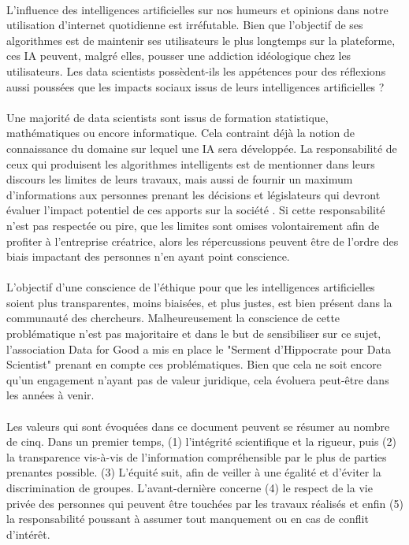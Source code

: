 \documentclass[10pt, french, a4paper]{report}
\begin{document}
\paragraph{}
L’influence des intelligences artificielles sur nos humeurs et opinions dans notre utilisation d’internet quotidienne est irréfutable. Bien que l’objectif de ses algorithmes est de maintenir ses utilisateurs le plus longtemps sur la plateforme, ces IA peuvent, malgré elles, pousser une addiction idéologique chez les utilisateurs. Les data scientists possèdent-ils les appétences pour des réflexions aussi poussées que les impacts sociaux issus de leurs intelligences artificielles ?

\paragraph{}
Une majorité de data scientists sont issus de formation statistique, mathématiques ou encore informatique. Cela contraint déjà la notion de connaissance du domaine sur lequel une IA sera développée. La responsabilité de ceux qui produisent les algorithmes intelligents est de mentionner dans leurs discours les limites de leurs travaux, mais aussi de fournir un maximum d’informations aux personnes prenant les décisions et législateurs qui devront évaluer l’impact potentiel de ces apports sur la société \citep{cointe_ethical_2017}. Si cette responsabilité n’est pas respectée ou pire, que les limites sont omises volontairement afin de profiter à l’entreprise créatrice, alors les répercussions peuvent être de l’ordre des biais impactant des personnes n’en ayant point conscience.

\paragraph{}
L’objectif d’une conscience de l’éthique pour que les intelligences artificielles soient plus transparentes, moins biaisées, et plus justes, est bien présent dans la communauté des chercheurs. Malheureusement la conscience de cette problématique n’est pas majoritaire et dans le but de sensibiliser sur ce sujet, l’association Data for Good a mis en place le "Serment d’Hippocrate pour Data Scientist" \citep{data_for_good_serment_2018} prenant en compte ces problématiques. Bien que cela ne soit encore qu’un engagement n’ayant pas de valeur juridique, cela évoluera peut-être dans les années à venir.

\paragraph{}
Les valeurs qui sont évoquées dans ce document peuvent se résumer au nombre de cinq. Dans un premier temps, (1) l’intégrité scientifique et la rigueur, puis (2) la transparence vis-à-vis de l’information compréhensible par le plus de parties prenantes possible. (3) L’équité suit, afin de veiller à une égalité et d’éviter la discrimination de groupes. L’avant-dernière concerne (4) le respect de la vie privée des personnes qui peuvent être touchées par les travaux réalisés et enfin (5) la responsabilité poussant à assumer tout manquement ou en cas de conflit d’intérêt.
\end{document}
